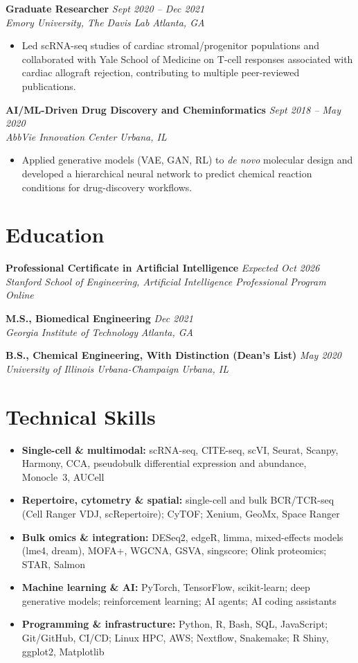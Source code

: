 \documentclass[letterpaper,11pt]{article}
\newcommand{\entry}[4]{%
    \textbf{#1} \hfill \textit{\color{graytext} #2} \\
    \textit{#3} \hfill \textit{\color{graytext} #4}\par
}
\begin{document}
\entry{Graduate Researcher}{Sept 2020 -- Dec 2021}{Emory University, The Davis Lab}{Atlanta, GA}
\begin{itemize}
    \item Led scRNA-seq studies of cardiac stromal/progenitor populations and collaborated with Yale School of Medicine on T-cell responses associated with cardiac allograft rejection, contributing to multiple peer-reviewed publications.
\end{itemize}

\entry{AI/ML-Driven Drug Discovery and Cheminformatics}{Sept 2018 -- May 2020}{AbbVie Innovation Center}{Urbana, IL}
\begin{itemize}
  \item Applied generative models (VAE, GAN, RL) to \textit{de novo} molecular design and developed a hierarchical neural network to predict chemical reaction conditions for drug-discovery workflows.
\end{itemize}

\newpage

\section*{Education}
\entry{Professional Certificate in Artificial Intelligence}{Expected Oct 2026}{Stanford School of Engineering, Artificial Intelligence Professional Program}{Online}
\entry{M.S., Biomedical Engineering}{Dec 2021}{Georgia Institute of Technology}{Atlanta, GA}
\entry{B.S., Chemical Engineering, With Distinction (Dean's List)}{May 2020}{University of Illinois Urbana-Champaign}{Urbana, IL}

\section*{Technical Skills}
\begin{itemize}
  \item \textbf{Single-cell \& multimodal:} scRNA-seq, CITE-seq, scVI, Seurat, Scanpy, Harmony, CCA, pseudobulk differential expression and abundance, Monocle~3, AUCell
  \item \textbf{Repertoire, cytometry \& spatial:} single-cell and bulk BCR/TCR-seq (Cell Ranger VDJ, scRepertoire); CyTOF; Xenium, GeoMx, Space Ranger
  \item \textbf{Bulk omics \& integration:} DESeq2, edgeR, limma, mixed-effects models (lme4, dream), MOFA+, WGCNA, GSVA, singscore; Olink proteomics; STAR, Salmon
  \item \textbf{Machine learning \& AI:} PyTorch, TensorFlow, scikit-learn;
deep generative models; reinforcement learning; AI agents;
AI coding assistants
  \item \textbf{Programming \& infrastructure:} Python, R, Bash, SQL, JavaScript; Git/GitHub, CI/CD; Linux HPC, AWS; Nextflow, Snakemake; R Shiny, ggplot2, Matplotlib
\end{itemize}
\end{document}
